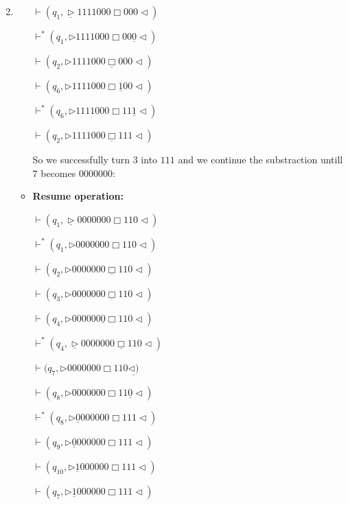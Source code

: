 \documentclass[12pt,a4paper]{article}
\makeatletter
\newtheorem*{solution}{Solution}
\theoremstyle{definition}
\renewenvironment{solution}[1][Solution] {\par\pushQED{\qed}\normalfont\topsep6\p@\@plus6\p@\relax\trivlist\item[\hskip\labelsep\bfseries#1\@addpunct{.}]\ignorespaces}{\popQED\endtrivlist\@endpefalse} \makeatother
\makeatother
\begin{document}
\begin{enumerate}
\begin{solution}
\begin{itemize}
	$\vdash (q_1,\underline{\triangleright}  1 1  1  1  0 0  0  \Box 0 0  0  \triangleleft)$

	$\vdash^{*} (q_1,\triangleright  1  1  1  1  0 0 0  \Box 0  0  \underline{0}   \triangleleft)$

	$\vdash (q_2,\triangleright  1  1  1  1  0  0  0  \underline{\Box}  0 0 0  \triangleleft)$

	$\vdash (q_6,\triangleright  1  1  1  1  0  0  0  \Box  \underline{1} 0 0  \triangleleft)$

	$\vdash^{*} (q_6,\triangleright  1  1  1  1  0  0  0  \Box  1 1 \underline{1}   \triangleleft)$

	$\vdash (q_2,\triangleright  1  1  1  1  0  0  0  \underline{\Box}  1 1 1 \triangleleft)$

 
	
	So we successfully turn $3$ into $111$ and we continue the substraction untill $7$ becomes $0000000$:
   
	\item \textbf{Resume operation:}
	
   $\vdash (q_1,\underline{\triangleright}  0 0 0 0  0 0  0  \Box 1 1  0  \triangleleft)$

   $\vdash^{*} (q_1,\triangleright  0 0 0 0 0 0 0  \Box 1 1 0   \triangleleft)$

   $\vdash (q_2,\triangleright  0 0 0 0  0 0 0  \underline{\Box} 1  1  0   \triangleleft)$

   $\vdash (q_3,\triangleright  0 0 0 0  0 0 0  \underline{\Box} 1  1  0   \triangleleft)$

   $\vdash (q_4,\triangleright  0 0 0 0  0 0  \underline{0}  \Box 1  1  0   \triangleleft)$

   $\vdash^{*} (q_4,\underline{\triangleright}  0 0 0 0  0 0 0  \underline{\Box} 1  1  0   \triangleleft)$

   $\vdash (q_7,\triangleright  0 0 0 0  0 0 0  \Box 1  1  0  \underline{\triangleleft)}$

   $\vdash (q_8,\triangleright  0 0 0 0  0 0 0 \Box 1  1 \underline{0}   \triangleleft)$

   $\vdash^{*} (q_8,\triangleright  \underline{0} 0 0 0  0 0 0 \Box 1  1  1 \triangleleft)$

   $\vdash (q_9,\triangleright  \underline{0} 0 0 0  0 0 0 \Box 1  1  1 \triangleleft)$

   $\vdash (q_{10},\triangleright  \underline{1} 0 0 0  0 0 0 \Box 1  1  1 \triangleleft)$

   $\vdash (q_{7},\triangleright  \underline{1} 0 0 0  0 0 0 \Box 1  1  1 \triangleleft)$



\end{itemize}
\end{solution}
\end{enumerate}
\end{document}
